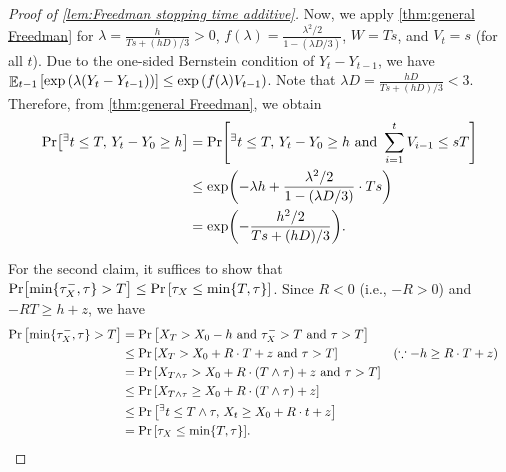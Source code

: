 \documentclass[letterpaper,11pt]{article}
\DeclarePairedDelimiter{\rbra}{\lparen}{\rparen} %
\DeclarePairedDelimiter{\cbra}{\lbrace}{\rbrace} %
\DeclarePairedDelimiter{\sbra}{\lbrack}{\rbrack} %
\DeclareMathOperator*{\E}{\mathbb{E}}
\newcommand{\bounded}{D}
\newcommand{\variance}{s}
\newcommand{\drift}{R}
\newcommand{\tinyexists}{{}^{\exists}}
\newcommand{\tauxminus}{\tau_X^-}
\begin{document}
\begin{proof}[Proof of \cref{lem:Freedman stopping time additive}]
    Now, we apply \cref{thm:general Freedman} for $\lambda=\frac{h}{T\variance+(h\bounded )/3} > 0$, 
      $f(\lambda)=\frac{\lambda^2/2}{1-(\lambda\bounded /3)}$, $W=T \variance$, and $V_t = s$ (for all $t$).
      Due to the one-sided Bernstein condition of $Y_t - Y_{t-1}$, we have $\E_{t-1}\qty[ \exp\qty( \lambda (Y_t - Y_{t-1}) ) ] \le \exp\qty( f(\lambda) V_{t-1} )$.
      Note that $\lambda\bounded =\frac{h \bounded}{T\variance+(h \bounded)/3}<3$.
      Therefore, from \cref{thm:general Freedman}, we obtain
      \begin{align*}
        \Pr\sbra*{{}^{\exists}t\le T,\,Y_t-Y_0\geq h}
        &=\Pr\sbra*{{}^{\exists}t\le T,\,Y_t-Y_0\geq h \text{ and }\sum_{i=1}^t V_{i-1}\leq \variance T}\\
        &\leq \exp\rbra*{-\lambda h+\frac{\lambda^2/2}{1-(\lambda\bounded/3)}\cdot T\variance }\\
        &=\exp\rbra*{-\frac{h^2/2}{T\variance+(h\bounded)/3}}.
      \end{align*}
      
      For the second claim, it suffices to show that $\Pr[\min\{\tauxminus,\tau\} >T] 
        \leq \Pr\qty[\tau_X \le \min\{T,\tau\}]$.
      Since $\drift < 0$ (i.e., $-\drift>0$) and $-\drift T\geq h+z$, we have
      \begin{align*}
        \Pr\qty[\min\cbra{\tauxminus,\tau} >T]
        &=\Pr\qty[X_T> X_0-h\textrm{ and }\tauxminus >T\textrm{ and }\tau>T] \\
        &\leq \Pr\qty[X_T> X_0+\drift\cdot T+z\textrm{ and }\tau>T] &&(\because -h\geq \drift\cdot T+z)\\
        &=\Pr\qty[X_{T\wedge \tau}> X_0+\drift\cdot (T\wedge \tau)+z\textrm{ and }\tau>T] \\
        &\leq \Pr\qty[X_{T\wedge \tau}\geq  X_0+\drift\cdot (T\wedge \tau)+z] \\
        &\leq \Pr\qty[\tinyexists t \le T \land \tau,\,X_t\geq X_0+\drift\cdot t+z ]\\
        &=\Pr\qty[\tau_X \le \min\{T,\tau\}].
      \end{align*}
    \end{proof}
\end{document}
